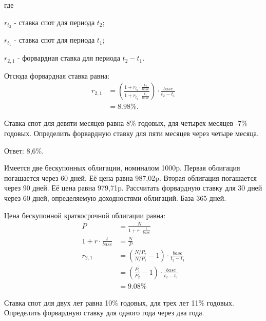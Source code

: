 \documentclass[12pt, table, a4paper,twoside]{exam}
\begin{document}
\begin{questions}
\begin{solution}[12em]
	\raggedright
	где
	
	$r_{t_2}$ - ставка спот для периода $t_2$;
	
	$r_{t_1}$ - ставка спот для периода $t_1$;
	
	$r_{2,1}$ - форвардная ставка для периода $t_2 - t_1$.
	
	Отсюда форвардная ставка равна:
	\begin{align}
	r_{2,1}&=\left( \frac{1+ r_{t_2} \cdot \frac{t_2}{base}}{1+ r_{t_1} \cdot \frac{t_1}{base}} \right) \cdot \frac{base}{t_2 - t_1}\\
	&=8.98\%.\nonumber
	\end{align}
\end{solution}



\question[10] Ставка спот для девяти месяцев равна 8\% годовых, для четырех месяцев -7\% годовых. Определить форвардную ставку для пяти месяцев через четыре месяца.

\begin{solution}[12em]
	
	\raggedright
	Ответ: 8,6\%.
\end{solution}



\question[10] Имеется две бескупонных облигации, номиналом 1000p. Первая облигация погашается через 60 дней. Её цена равна 987,02p. Вторая облигация погашается через 90 дней. Её цена равна 979,71p. Рассчитать форвардную ставку для 30 дней через 60 дней, определяемую доходностями облигаций. База 365 дней.

\begin{solution}[12em]
	
	\raggedright
	Цена бескупонной краткосрочной облигации равна:
	\begin{align}
	P&=\frac{N}{1+r\cdot \frac{t}{base}}\\
	1+r\cdot \frac{t}{base}&=\frac{N}{P}\nonumber\\
	r_{2,1}&=\left( \frac{N/P_2}{N/P_1}-1 \right) \cdot \frac{base}{t_2 - t_1}\nonumber\\
	&=\left( \frac{P_1}{P_2} - 1 \right) \cdot \frac{base}{t_2 - t_1}\\
	&=9.08\%\nonumber
	\end{align}
\end{solution}


\question[10] Ставка спот для двух лет равна 10\% годовых, для трех лет 11\% годовых. Определить форвардную ставку для одного года через два года. 


\end{questions}
\end{document}
